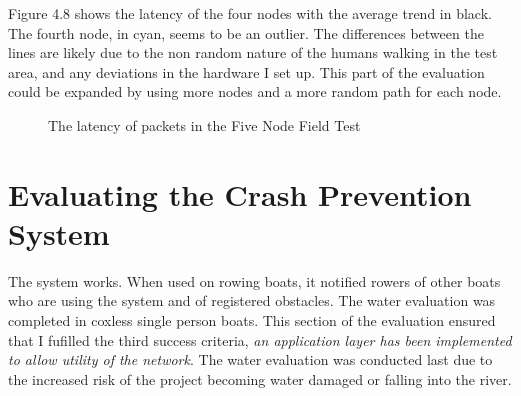 \documentclass[12pt,a4paper]{report}
\begin{document}
Figure 4.8 shows the latency of the four nodes with the average trend in black. The fourth node, in cyan, seems to be an outlier. The differences between the lines are likely due to the non random nature of the humans walking in the test area, and any deviations in the hardware I set up. This part of the evaluation could be expanded by using more nodes and a more random path for each node. 
\begin{table}[h]
\begin{center}
\end{center}
\caption{Results from the five node evaluation and comparison to other papers}
\end{table}  

\begin{figure}[h]
\begin{center}

\end{center}
\caption{The latency of packets in the Five Node Field Test}
\end{figure}

\section{Evaluating the Crash Prevention System}
The system works. When used on rowing boats, it notified rowers of other boats who are using the system and of registered obstacles. The water evaluation was completed in coxless single person boats. This section of the evaluation ensured that I fufilled the third success criteria, \emph{an application layer has been implemented to allow utility of the network}. The water evaluation was conducted last due to the increased risk of the project becoming water damaged or falling into the river. \\ 
\end{document}
